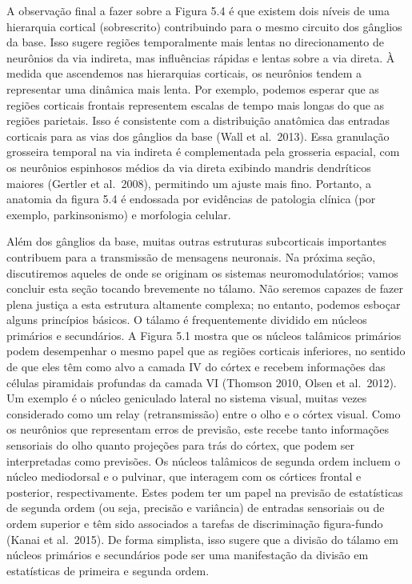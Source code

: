 \documentclass[
  12pt,
]{book}
\begin{document}
A observação final a fazer sobre a Figura 5.4 é que existem dois níveis de uma hierarquia cortical (sobrescrito) contribuindo para o mesmo circuito dos gânglios da base. Isso sugere regiões temporalmente mais lentas no direcionamento de neurônios da via indireta, mas influências rápidas e lentas sobre a via direta. À medida que ascendemos nas hierarquias corticais, os neurônios tendem a representar uma dinâmica mais lenta. Por exemplo, podemos esperar que as regiões corticais frontais representem escalas de tempo mais longas do que as regiões parietais. Isso é consistente com a distribuição anatômica das entradas corticais para as vias dos gânglios da base (Wall et al.~2013). Essa granulação grosseira temporal na via indireta é complementada pela grosseria espacial, com os neurônios espinhosos médios da via direta exibindo mandris dendríticos maiores (Gertler et al.~2008), permitindo um ajuste mais fino. Portanto, a anatomia da figura 5.4 é endossada por evidências de patologia clínica (por exemplo, parkinsonismo) e morfologia celular.

Além dos gânglios da base, muitas outras estruturas subcorticais importantes contribuem para a transmissão de mensagens neuronais. Na próxima seção, discutiremos aqueles de onde se originam os sistemas neuromodulatórios; vamos concluir esta seção tocando brevemente no tálamo. Não seremos capazes de fazer plena justiça a esta estrutura altamente complexa; no entanto, podemos esboçar alguns princípios básicos. O tálamo é frequentemente dividido em núcleos primários e secundários. A Figura 5.1 mostra que os núcleos talâmicos primários podem desempenhar o mesmo papel que as regiões corticais inferiores, no sentido de que eles têm como alvo a camada IV do córtex e recebem informações das células piramidais profundas da camada VI (Thomson 2010, Olsen et al.~2012). Um exemplo é o núcleo geniculado lateral no sistema visual, muitas vezes considerado como um relay (retransmissão) entre o olho e o córtex visual. Como os neurônios que representam erros de previsão, este recebe tanto informações sensoriais do olho quanto projeções para trás do córtex, que podem ser interpretadas como previsões. Os núcleos talâmicos de segunda ordem incluem o núcleo mediodorsal e o pulvinar, que interagem com os córtices frontal e posterior, respectivamente. Estes podem ter um papel na previsão de estatísticas de segunda ordem (ou seja, precisão e variância) de entradas sensoriais ou de ordem superior e têm sido associados a tarefas de discriminação figura-fundo (Kanai et al.~2015). De forma simplista, isso sugere que a divisão do tálamo em núcleos primários e secundários pode ser uma manifestação da divisão em estatísticas de primeira e segunda ordem.
\end{document}
